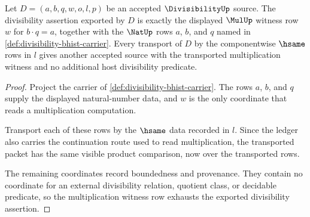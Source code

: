 \begin{theorem}
\label{thm:divisibility-mul-witness-closure}
Let $D=(a,b,q,w,o,l,p)$ be an accepted $\DivisibilityUp$ source. The
divisibility assertion exported by $D$ is exactly the displayed
$\MulUp$ witness row $w$ for $b\cdot q=a$, together with the $\NatUp$ rows
$a$, $b$, and $q$ named in \autoref{def:divisibility-bhist-carrier}. Every
transport of $D$ by the componentwise $\hsame$ rows in $l$ gives another
accepted source with the transported multiplication witness and no additional
host divisibility predicate.
\end{theorem}
\begin{proof}
Project the carrier of \autoref{def:divisibility-bhist-carrier}. The rows
$a$, $b$, and $q$ supply the displayed natural-number data, and $w$ is the
only coordinate that reads a multiplication computation.

Transport each of these rows by the $\hsame$ data recorded in $l$. Since the
ledger also carries the continuation route used to read multiplication, the
transported packet has the same visible product comparison, now over the
transported rows.

The remaining coordinates record boundedness and provenance. They contain no
coordinate for an external divisibility relation, quotient class, or
decidable predicate, so the multiplication witness row exhausts the exported
divisibility assertion.
\end{proof}

